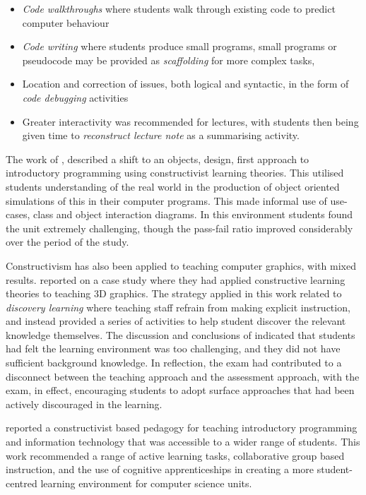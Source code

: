 \begin{itemize}[noitemsep,nolistsep]
	\item \emph{Code walkthroughs} where students walk through existing code to predict computer behaviour
	\item \emph{Code writing} where students produce small programs, small programs or pseudocode may be provided as \emph{scaffolding} for more complex tasks, 
	\item Location and correction of issues, both logical and syntactic, in the form of \emph{code debugging} activities
	\item Greater interactivity was recommended for lectures, with students then being given time to \emph{reconstruct lecture note} as a summarising activity. 
\end{itemize}
 

The work of \citet{Thramboulidis:2003,Thramboulidis:2003a,Thramboulidis:2003b}, described a shift to an objects, design, first approach to introductory programming using constructivist learning theories. This utilised students understanding of the real world in the production of object oriented simulations of this in their computer programs. This made informal use of use-cases, class and object interaction diagrams. In this environment students found the unit extremely challenging, though the pass-fail ratio improved considerably over the period of the study.


Constructivism has also been applied to teaching computer graphics, with mixed results. \citet{Taxen:2004} reported on a case study where they had applied constructive learning theories to teaching 3D graphics. The strategy applied in this work related to \emph{discovery learning} \cite{Duffy:1996} where teaching staff refrain from making explicit instruction, and instead provided a series of activities to help student discover the relevant knowledge themselves. The discussion and conclusions of \citet{Taxen:2004} indicated that students had felt the learning environment was too challenging, and they did not have sufficient background knowledge. In reflection, the exam had contributed to a disconnect between the teaching approach and the assessment approach, with the exam, in effect, encouraging students to adopt surface approaches that had been actively discouraged in the learning.

\citet{Wulf:2005} reported a constructivist based pedagogy for teaching introductory programming and information technology that was accessible to a wider range of students. This work recommended a range of active learning tasks, collaborative group based instruction, and the use of cognitive apprenticeships in creating a more student-centred learning environment for computer science units.

